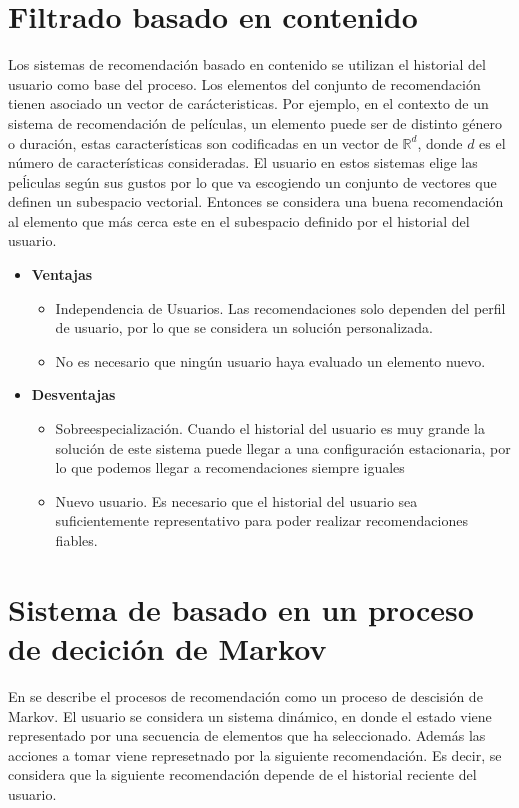 \section{Filtrado basado en contenido} 
    
    Los sistemas de recomendación basado en contenido \cite{lops2011content} se utilizan el historial del usuario como base del proceso. Los elementos del conjunto de recomendación tienen asociado un vector de carácteristicas. Por ejemplo, en el contexto de un sistema de recomendación de películas, un elemento puede ser de distinto género o duración, estas características son codificadas en un vector de $\mathbb{R}^d$, donde $d$ es el número de características consideradas. El usuario en estos sistemas elige las peĺiculas según sus gustos por lo que va escogiendo un conjunto de vectores que definen un subespacio vectorial. Entonces se considera una buena recomendación al elemento que más cerca este en el subespacio definido por el historial del usuario. 

    \begin{itemize}
        \item \textbf{Ventajas} 
        \begin{itemize}
            \item Independencia de Usuarios. Las recomendaciones solo dependen del perfil de usuario, por lo que se considera un solución personalizada.
            \item No es necesario que ningún usuario haya evaluado un elemento nuevo.
        \end{itemize}
        \item \textbf{Desventajas}
        \begin{itemize}
            \item Sobreespecialización. Cuando el historial del usuario es muy grande la solución de este sistema puede llegar a una configuración estacionaria, por lo que podemos llegar a recomendaciones siempre iguales
            \item Nuevo usuario. Es necesario que el historial del usuario sea suficientemente representativo para poder realizar recomendaciones fiables.
        \end{itemize}
    \end{itemize}

\section{Sistema de basado en un proceso de decición de Markov}
    En \cite{shani2005mdp} se describe el procesos de recomendación como un proceso de descisión de Markov. El usuario se considera un sistema dinámico, en donde el estado viene representado por una secuencia de elementos que ha seleccionado. Además las acciones a tomar viene represetnado por la siguiente recomendación. Es decir, se considera que la siguiente recomendación depende de el historial reciente del usuario. 
    
